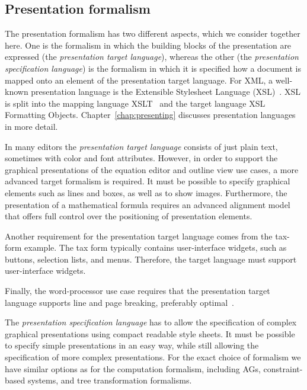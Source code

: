 \documentclass{speauth}
\begin{document}
\subsection{Presentation formalism} \label{sect:presentationFormalism}

The presentation formalism has two different aspects, which we consider together here. One is the formalism in which the building blocks of the presentation are expressed (the {\em presentation target language}), whereas the other  (the {\em presentation specification language}) is the formalism in which it is specified how a document is mapped onto an element of the presentation target language. For XML, a well-known presentation language is the Extensible Stylesheet Language (XSL)~\cite{xsl10}. XSL is split into the mapping language XSLT~\cite{xslt10} and the target language XSL Formatting Objects. Chapter~\ref{chap:presenting} discusses presentation languages in more detail.

In many editors the {\em presentation target language} consists of just plain text, sometimes with color and font attributes. However, in order to support the graphical presentations of the equation editor and outline view use cases, a more advanced target formalism is required. It must be possible to specify graphical elements such as lines and boxes, as well as to show images. Furthermore, the presentation of a mathematical formula requires an advanced alignment model that offers full control over the positioning of presentation elements.

Another requirement for the presentation target language comes from the tax-form example. The tax form typically contains user-interface widgets, such as buttons, selection lists, and menus. Therefore, the target language must support user-interface widgets.


Finally, the word-processor use case requires that the presentation target language supports line and page breaking, preferably optimal~\cite{knuth82breaking}. 

The {\em presentation specification language} has to allow the specification of complex graphical presentations using compact readable style sheets. It must be possible to specify simple presentations in an easy way, while still allowing the specification of more complex presentations. For the exact choice of formalism we have similar options as for the computation formalism, including AGs, constraint-based systems, and tree transformation formalisms.
\end{document}

